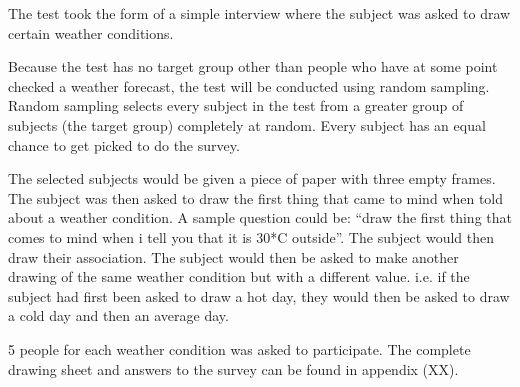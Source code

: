 The test took the form of a simple interview where the subject was asked to draw certain weather conditions.

Because the test has no target group other than people who have at some point checked a weather forecast, the test will be conducted using random sampling.
Random sampling selects every subject in the test from a greater group of subjects (the target group) completely at random. 
Every subject has an equal chance to get picked to do the survey.

The selected subjects would be given a piece of paper with three empty frames. 
The subject was then asked to draw the first thing that came to mind when told about a weather condition. 
A sample question could be: \enquote{draw the first thing that comes to mind when i tell you that it is 30*C outside}. 
The subject would then draw their association. 
The subject would then be asked to make another drawing of the same weather condition but with a different value. 
i.e. if the subject had first been asked to draw a hot day, they would then be asked to draw a cold day and then an average day.

5 people for each weather condition was asked to participate. 
The complete drawing sheet and answers to the survey can be found in appendix (XX).

